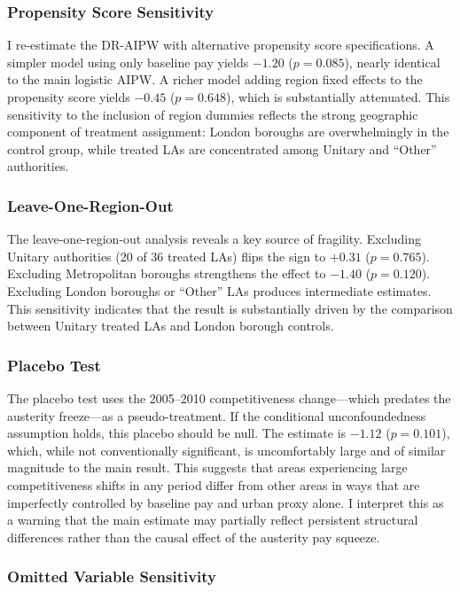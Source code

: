 \documentclass[12pt]{article}
\begin{document}
\subsubsection{Propensity Score Sensitivity}

I re-estimate the DR-AIPW with alternative propensity score specifications. A simpler model using only baseline pay yields $-1.20$ ($p = 0.085$), nearly identical to the main logistic AIPW. A richer model adding region fixed effects to the propensity score yields $-0.45$ ($p = 0.648$), which is substantially attenuated. This sensitivity to the inclusion of region dummies reflects the strong geographic component of treatment assignment: London boroughs are overwhelmingly in the control group, while treated LAs are concentrated among Unitary and ``Other'' authorities.

\subsubsection{Leave-One-Region-Out}

The leave-one-region-out analysis reveals a key source of fragility. Excluding Unitary authorities (20 of 36 treated LAs) flips the sign to $+0.31$ ($p = 0.765$). Excluding Metropolitan boroughs strengthens the effect to $-1.40$ ($p = 0.120$). Excluding London boroughs or ``Other'' LAs produces intermediate estimates. This sensitivity indicates that the result is substantially driven by the comparison between Unitary treated LAs and London borough controls.

\subsubsection{Placebo Test}

The placebo test uses the 2005--2010 competitiveness change---which predates the austerity freeze---as a pseudo-treatment. If the conditional unconfoundedness assumption holds, this placebo should be null. The estimate is $-1.12$ ($p = 0.101$), which, while not conventionally significant, is uncomfortably large and of similar magnitude to the main result. This suggests that areas experiencing large competitiveness shifts in any period differ from other areas in ways that are imperfectly controlled by baseline pay and urban proxy alone. I interpret this as a warning that the main estimate may partially reflect persistent structural differences rather than the causal effect of the austerity pay squeeze.

\subsubsection{Omitted Variable Sensitivity}
\end{document}

